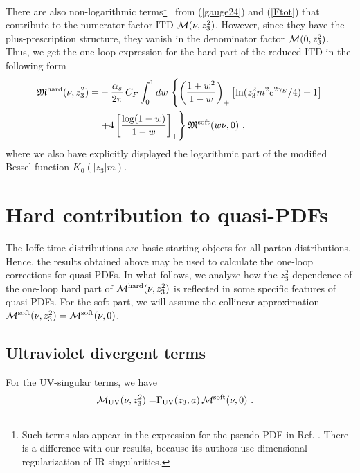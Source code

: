 \documentclass[final,5p,times,twocolumn]{elsarticle}
\newcommand{\nn}{\nonumber \\ }
\begin{document}
There are also  non-logarithmic terms\footnote{Such terms also appear
in the expression for the pseudo-PDF in  Ref. \cite{Ji:2017rah}. 
There is a difference  with  %
our results, because its authors use dimensional regularization of IR singularities.}%
\   from (\ref{gauge24}) and   (\ref{Ftot})
that contribute to the  numerator factor  ITD ${\cal M} (\nu, z_3^2)$. 
However, since they have the plus-prescription 
 structure,   they vanish in   the denominator factor 
 ${\cal M} (0, z_3^2)$. 
Thus,  we get the one-loop expression for the hard part of  the reduced 
ITD in the following form 
 \begin{align} 
{\mathfrak M}^{\rm hard}  (\nu, z_3^2)    =&  -  \frac{\alpha_s}{2\pi} \, C_F
\int_0^1  dw \,  \left \{   \left (\frac{1+w^2} {1-w}   \right )_+   \left [ \ln ( z_3^2m^2 e^{2\gamma_E}/4)  +1 \right ]
\right. \nn   & \left. 
+ 4   \left [\frac{\log (1-w)}{1-w} \right]_+ 
\right \} 
{\mathfrak  M}^{\rm soft}  (w \nu, 0)   \  , 
\label{Mha}
 \end{align}
 where we also have explicitly displayed the 
 logarithmic part of the modified Bessel function 
$K_0 (|z_3| m)$. 

 
 \setcounter{equation}{0}
 
  \section{Hard contribution to quasi-PDFs}
 
 
 The Ioffe-time distributions are basic starting objects 
 for all parton distributions. Hence, the results obtained above
 may be used to calculate the one-loop corrections for quasi-PDFs.
 In what follows, we analyze how the $z_3^2$-dependence 
 of the one-loop hard part 
  of   ${\cal  M}^{\rm hard}  (\nu, z_3^2)$ is reflected  
  in some specific features of quasi-PDFs.
  For the soft part, we will assume the collinear approximation   %
  ${\cal M}^{\rm soft}  ( \nu, z_3^2) = {\cal M}^{\rm soft}  ( \nu, 0)$. %
 
 
\subsection{Ultraviolet divergent  terms} 


 For the UV-singular terms, we have 
  \begin{align} 
{\cal  M}_{\rm UV}  (\nu, z_3^2)    =& 
\Gamma_{\rm UV}(z_3,a) \,   {\cal M}^{\rm soft}  ( \nu, 0)  \  . 
\label{MUVa}
 \end{align}
 
\end{document}
